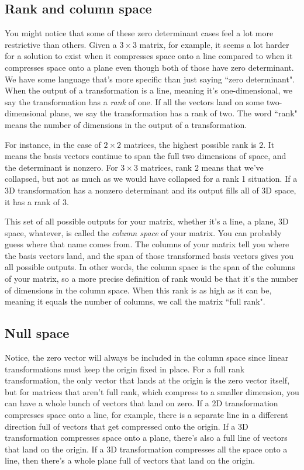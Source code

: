 \subsection{Rank and column space}

You might notice that some of these zero determinant cases feel a lot more
restrictive than others. Given a $3 \times 3$ matrix, for example, it seems a
lot harder for a solution to exist when it compresses space onto a line compared
to when it compresses space onto a plane even though both of those have zero
determinant. We have some language that's more specific than just saying ``zero
determinant". When the output of a transformation is a line, meaning it's
one-dimensional, we say the transformation has a \textit{rank} of one. If all
the vectors land on some two-dimensional plane, we say the transformation has a
rank of two. The word ``rank" means the number of dimensions in the output of a
transformation.

For instance, in the case of $2 \times 2$ matrices, the highest possible rank is
$2$. It means the basis vectors continue to span the full two dimensions of
space, and the determinant is nonzero. For $3 \times 3$ matrices, rank $2$ means
that we've collapsed, but not as much as we would have collapsed for a rank 1
situation. If a 3D transformation has a nonzero determinant and its output fills
all of 3D space, it has a rank of $3$.

This set of all possible outputs for your matrix, whether it's a line, a plane,
3D space, whatever, is called the \textit{column space} of your matrix. You can
probably guess where that name comes from. The columns of your matrix tell you
where the basis vectors land, and the span of those transformed basis vectors
gives you all possible outputs. In other words, the column space is the span of
the columns of your matrix, so a more precise definition of rank would be that
it's the number of dimensions in the column space. When this rank is as high as
it can be, meaning it equals the number of columns, we call the matrix ``full
rank".

\subsection{Null space}

Notice, the zero vector will always be included in the column space since linear
transformations must keep the origin fixed in place. For a full rank
transformation, the only vector that lands at the origin is the zero vector
itself, but for matrices that aren't full rank, which compress to a smaller
dimension, you can have a whole bunch of vectors that land on zero. If a 2D
transformation compresses space onto a line, for example, there is a separate
line in a different direction full of vectors that get compressed onto the
origin. If a 3D transformation compresses space onto a plane, there's also a
full line of vectors that land on the origin. If a 3D transformation compresses
all the space onto a line, then there's a whole plane full of vectors that land
on the origin.

